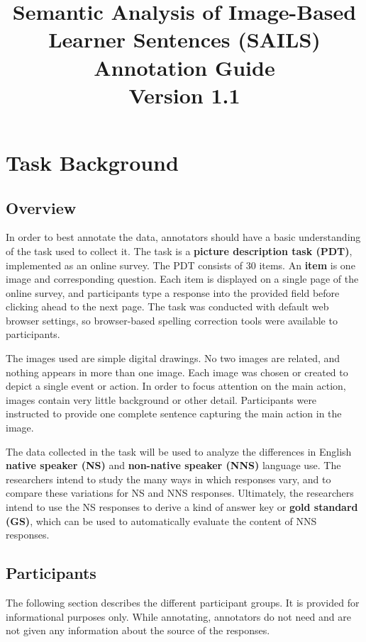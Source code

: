 \documentclass[12pt]{article}
\title{\large{Semantic Analysis of Image-Based Learner Sentences (SAILS)} \\ Annotation Guide \\ Version 1.1}
\date{}
\begin{document}
\maketitle
\tableofcontents
\clearpage

\section{Task Background} \label{sec:background}

\subsection{Overview}
In order to best annotate the data, annotators should have a basic understanding of the task used to collect it. The task is a \textbf{picture description task (PDT)}, implemented as an online survey. The PDT consists of 30 items. An \textbf{item} is one image and corresponding question. Each item is displayed on a single page of the online survey, and participants type a response into the provided field before clicking ahead to the next page. The task was conducted with default web browser settings, so browser-based spelling correction tools were available to participants.

The images used are simple digital drawings. No two images are related, and nothing appears in more than one image. Each image was chosen or created to depict a single event or action. In order to focus attention on the main action, images contain very little background or other detail. Participants were instructed to provide one complete sentence capturing the main action in the image. 

The data collected in the task will be used to analyze the differences in English \textbf{native speaker (NS)} and \textbf{non-native speaker (NNS)} language use. The researchers intend to study the many ways in which responses vary, and to compare these variations for NS and NNS responses. Ultimately, the researchers intend to use the NS responses to derive a kind of answer key or \textbf{gold standard (GS)}, which can be used to automatically evaluate the content of NNS responses.

\subsection{Participants}
The following section describes the different participant groups. It is provided for informational purposes only. While annotating, annotators do not need and are not given any information about the source of the responses.
\end{document}
